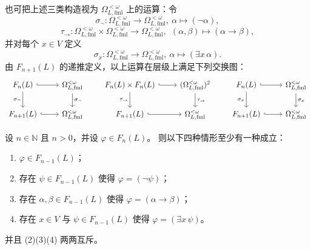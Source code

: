 \documentclass[lang=cn,a4paper,newtx,section]{elegantbook}
\begin{document}
 \begin{remark}
 也可把上述三类构造视为 $\Omega_{L,\mathrm{fml}}^{<\omega}$ 上的运算：令
 \[
   \sigma_{\neg}:\Omega_{L,\mathrm{fml}}^{<\omega}\to\Omega_{L,\mathrm{fml}}^{<\omega},\ \alpha\longmapsto(\neg\alpha),
 \]
 \[
   \tau_{\to}:\Omega_{L,\mathrm{fml}}^{<\omega}\times\Omega_{L,\mathrm{fml}}^{<\omega}\to\Omega_{L,\mathrm{fml}}^{<\omega},\ \ (\alpha,\beta)\longmapsto(\alpha\to\beta),
 \]
 并对每个 $x\in V$ 定义
 \[
   \sigma_x:\Omega_{L,\mathrm{fml}}^{<\omega}\to\Omega_{L,\mathrm{fml}}^{<\omega},\ \alpha\longmapsto(\exists x\,\alpha).
 \]
 由 $F_{n+1}(L)$ 的递推定义，以上运算在层级上满足下列交换图：
 \[
 \begin{tikzcd}
 F_n(L) \arrow[r, hook] \arrow[d, "{\sigma_{\neg}}"'] & \Omega_{L,\mathrm{fml}}^{<\omega} \arrow[d, "{\sigma_{\neg}}"] \\
 F_{n+1}(L) \arrow[r, hook] & \Omega_{L,\mathrm{fml}}^{<\omega}
 \end{tikzcd}
 \qquad
 \begin{tikzcd}
 F_n(L)\times F_n(L) \arrow[r, hook] \arrow[d, "{\tau_{\to}}"'] & (\Omega_{L,\mathrm{fml}}^{<\omega})^{2} \arrow[d, "{\tau_{\to}}"] \\
 F_{n+1}(L) \arrow[r, hook] & \Omega_{L,\mathrm{fml}}^{<\omega}
 \end{tikzcd}
 \qquad
 \begin{tikzcd}
 F_n(L) \arrow[r, hook] \arrow[d, "{\sigma_x}"'] & \Omega_{L,\mathrm{fml}}^{<\omega} \arrow[d, "{\sigma_x}"] \\
 F_{n+1}(L) \arrow[r, hook] & \Omega_{L,\mathrm{fml}}^{<\omega}
 \end{tikzcd}
 \]
 \end{remark}
 
 \begin{lemma}
 设 $n\in\mathbb N$ 且 $n>0$，并设 $\varphi\in F_n(L)$。
 则以下四种情形至少有一种成立：
 \begin{enumerate}
   \item $\varphi\in F_{n-1}(L)$；
   \item 存在 $\psi\in F_{n-1}(L)$ 使得 $\varphi=(\neg\psi)$；
   \item 存在 $\alpha,\beta\in F_{n-1}(L)$ 使得 $\varphi=(\alpha\to\beta)$；
   \item 存在 $x\in V$ 与 $\psi\in F_{n-1}(L)$ 使得 $\varphi=(\exists x\,\psi)$。
 \end{enumerate}
 并且 (2)(3)(4) 两两互斥。
 \end{lemma}
 
\end{document}
